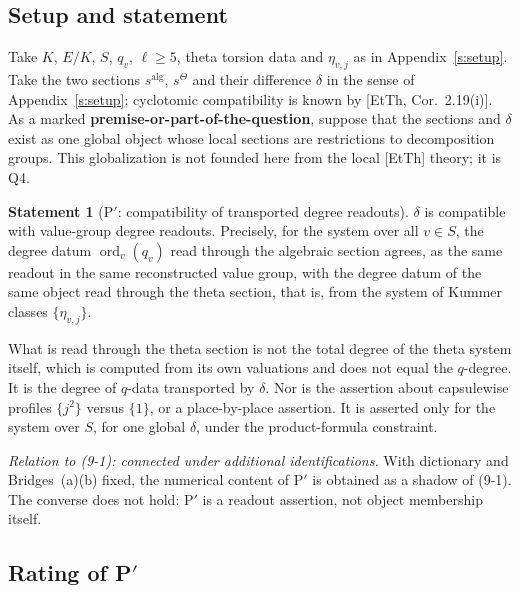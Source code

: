 \documentclass[11pt]{article}
\newcommand{\ord}{\operatorname{ord}}
\theoremstyle{definition}
\newtheorem{statement}{Statement}
\begin{document}
\subsection{Setup and statement}

Take $K$, $E/K$, $S$, $q_v$, $\ell\ge5$, theta torsion data and
$\eta_{v,j}$ as in Appendix~\ref{s:setup}.  Take the two sections
$s^{\mathrm{alg}}$, $s^\Theta$ and their difference $\delta$ in
the sense of Appendix~\ref{s:setup}; cyclotomic compatibility is known by
[EtTh, Cor.~2.19(i)].  As a marked
\textbf{premise-or-part-of-the-question}, suppose that the
sections and $\delta$ exist as one global object whose local
sections are restrictions to decomposition groups.  This
globalization is not founded here from the local [EtTh] theory;
it is Q4.

\begin{statement}[P$'$: compatibility of transported degree readouts]
$\delta$ is compatible with value-group degree readouts.
Precisely, for the system over all $v\in S$, the degree datum
$\ord_v(q_v)$ read through the algebraic section agrees, as the
same readout in the same reconstructed value group, with the
degree datum of the same object read through the theta section,
that is, from the system of Kummer classes $\{\eta_{v,j}\}$.
\end{statement}

What is read through the theta section is not the total degree
of the theta system itself, which is computed from its own
valuations and does not equal the $q$-degree.  It is the degree
of $q$-data transported by $\delta$.  Nor is the assertion about
capsulewise profiles $\{j^2\}$ versus $\{1\}$, or a place-by-place
assertion.  It is asserted only for the system over $S$, for one
global $\delta$, under the product-formula constraint.

\emph{Relation to (9-1): connected under additional
identifications.}  With dictionary and Bridges~(a)(b) fixed, the
numerical content of P$'$ is obtained as a shadow of (9-1).  The
converse does not hold: P$'$ is a readout assertion, not object
membership itself.

\subsection{Rating of \texorpdfstring{P$'$}{P'}}
\end{document}
